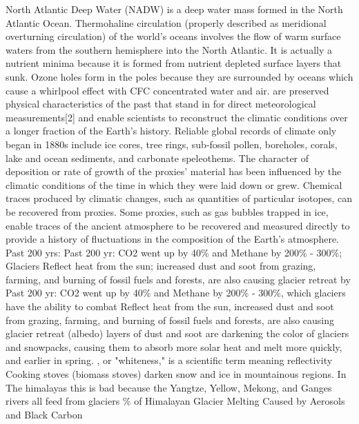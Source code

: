 		North Atlantic Deep Water (NADW) is a deep water mass formed in the North Atlantic Ocean. Thermohaline circulation (properly described as meridional overturning circulation) of the world's oceans involves the flow of warm surface waters from the southern hemisphere into the North Atlantic. It is actually a nutrient minima because it is formed from nutrient depleted surface layers that sunk.
		Ozone holes form in the poles because they are surrounded by oceans which cause a whirlpool effect with CFC concentrated water and air. 
		\ddd {} are preserved physical characteristics of the past that stand in for direct meteorological measurements[2] and enable scientists to reconstruct the climatic conditions over a longer fraction of the Earth's history.
		\ddd Reliable global records of climate only began in 1880s
			include ice cores, tree rings, sub-fossil pollen, boreholes, corals, lake and ocean sediments, and carbonate speleothems. The character of deposition or rate of growth of the proxies' material has been influenced by the climatic conditions of the time in which they were laid down or grew. Chemical traces produced by climatic changes, such as quantities of particular isotopes, can be recovered from proxies. Some proxies, such as gas bubbles trapped in ice, enable traces of the ancient atmosphere to be recovered and measured directly to provide a history of fluctuations in the composition of the Earth's atmosphere.
	Past 200 yrs: Past 200 yr: CO2 went up by 40\% and Methane by 200\% - 300\%; Glaciers Reflect heat from the sun; increased dust and soot from grazing, farming, and burning of fossil fuels and forests, are also causing glacier retreat by
	\ddd Past 200 yr: CO2 went up by 40\% and Methane by 200\% - 300\%, which glaciers have the ability to combat
	\ddd Reflect heat from the sun, 
	\ddd increased dust and soot from grazing, farming, and burning of fossil fuels and forests, are also causing glacier retreat (albedo)
	\ddd layers of dust and soot are darkening the color of glaciers and snowpacks, causing them to absorb more solar heat and melt more quickly, and earlier in spring.
	\ddd {}, or "whiteness," is a scientific term meaning reflectivity
	\ddd Cooking stoves (biomass stoves) darken snow and ice in mountainous regions. In The himalayas this is bad because the Yangtze, Yellow, Mekong, and Ganges rivers all feed from glaciers
	\% of Himalayan Glacier Melting Caused by Aerosols and Black Carbon
